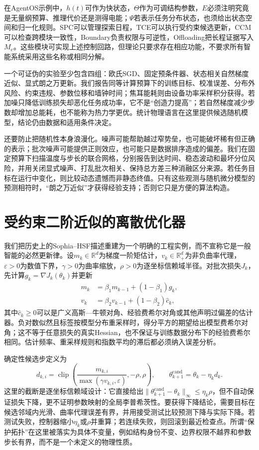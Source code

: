 在AgentOS示例中，$h(t)$可作为快状态，$\Theta$作为可调结构参数，$E$必须注明究竟是无量纲预算、推理代价还是测得电能；$\Psi$若表示任务分布状态，也须给出状态空间和归一化规则。SPC可以管理探索日程，TCE可以执行受约束候选更新，CCM可以检查跨模块一致性，Boundary负责权限与可逆性，Offloading把长程证据写入$M_e$。这些模块可实现上述控制回路，但理论只要求存在相应功能，不要求所有智能系统采用这些名称或相同分解。

一个可证伪的实验至少包含四组：欧氏SGD、固定预条件器、状态相关自然梯度近似、显式朗之万更新。我们报告同等计算预算下的训练目标、校准误差、分布外风险、约束违规、参数位移和墙钟时间；焦耳能耗则由设备功率采样积分获得。若加噪只降低训练损失却恶化任务成功率，它不是“创造力提高”；若自然梯度减少步数却增加总能耗，也不能称为热力学更优。统计物理语言在这里提供候选随机模型，结论仍由数据和适用条件决定。

还要防止把随机性本身浪漫化。噪声可能帮助越过窄势垒，也可能破坏稀有但正确的表示；批次噪声可能提供正则效应，也可能只是数据排序造成的偏差。我们在固定预算下扫描温度与步长的联合网格，分别报告到达时间、稳态波动和最坏分位风险，并用关闭显式噪声、打乱批次相关、保持总方差三种消融区分来源。若任务目标在运行中变化，则比较动态遗憾而非静态终值。只有这些观测与随机微分模型的预测相符时，“朗之万近似”才获得经验支持；否则它只是方便的算法构造。

\section{受约束二阶近似的离散优化器}
\label{sec:engineering_mapping_optimizer}

我们把历史上的Sophia--HSF描述重建为一个明确的工程实例，而不宣称它是一般智能的必然更新律。设$m_k\in\mathbb R^d$为梯度一阶矩估计，$v_k\in\mathbb R_+^d$为非负曲率代理，$\varepsilon>0$为数值下界，$\gamma>0$为曲率缩放，$\rho>0$为逐坐标信赖域半径。对批次损失$J_k$，先计算$g_k=\nabla J_k(\theta_k)$并更新
\begin{align}
m_k&=\beta_1m_{k-1}+(1-\beta_1)g_k,\\
v_k&=\beta_2v_{k-1}+(1-\beta_2)\widehat c_k,
\end{align}
其中$\widehat c_k\geq0$可以是广义高斯—牛顿对角、经验费希尔对角或其他声明过偏差的估计器。负对数似然且标签按模型分布重采样时，得分平方的期望给出模型费希尔对角；这不等于任意损失的真实Hessian，也不保证与训练数据分布下的经验费希尔相同。估计频率、重采样规则和指数平均的滞后都必须纳入误差分析。

确定性候选步定义为
\begin{equation}
d_{k,i}=\operatorname{clip}\!\left(
\frac{m_{k,i}}{\max(\gamma v_{k,i},\varepsilon)},-\rho,\rho\right),
\qquad
\theta_{k+1}^{\mathrm{cand}}=\theta_k-\eta_k d_k.
\end{equation}
这里的截断是逐坐标信赖域设计：它直接给出$\|\theta_{k+1}^{\mathrm{cand}}-\theta_k\|_\infty\leq\eta_k\rho$，但不自动保证损失下降，更不证明参数映射的全局李普希茨性。要获得下降结论，需要目标在候选邻域内光滑、曲率代理误差有界，并用接受测试比较预测下降与实际下降。若测试失败，控制器缩小$\eta_k$或$\rho$并重算；若连续失败，则回滚到最近检查点。所谓“保护拓扑”在这里被落实为具体不变量，例如结构身份不变、边界权限不越界和参数步长有界，而不是一个未定义的物理性质。

